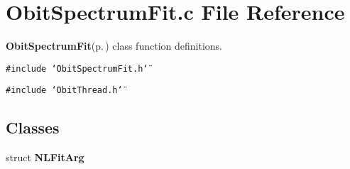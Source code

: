 \section{Obit\-Spectrum\-Fit.c File Reference}
\label{ObitSpectrumFit_8c}
{\bf Obit\-Spectrum\-Fit}{\rm (p.\,\pageref{structObitSpectrumFit})} class function definitions. 

{\tt \#include \char`\"{}Obit\-Spectrum\-Fit.h\char`\"{}}\par
{\tt \#include \char`\"{}Obit\-Thread.h\char`\"{}}\par
\subsection*{Classes}
\begin{CompactItemize}
\item 
struct {\bf NLFit\-Arg}
\end{CompactItemize}
